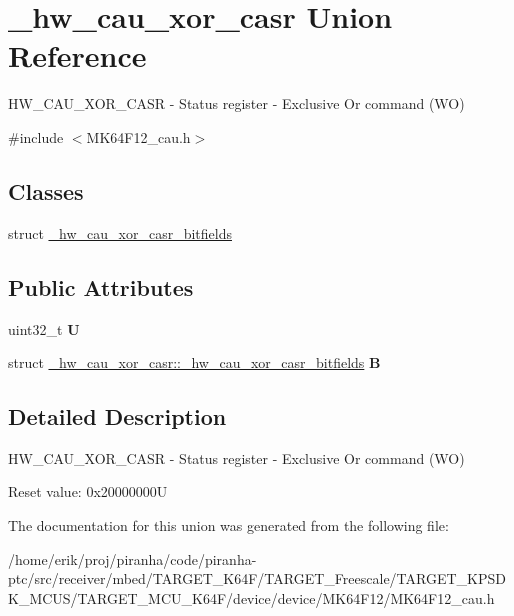 \hypertarget{union__hw__cau__xor__casr}{}\section{\+\_\+hw\+\_\+cau\+\_\+xor\+\_\+casr Union Reference}
\label{union__hw__cau__xor__casr}


H\+W\+\_\+\+C\+A\+U\+\_\+\+X\+O\+R\+\_\+\+C\+A\+SR -\/ Status register -\/ Exclusive Or command (WO)  




{\ttfamily \#include $<$M\+K64\+F12\+\_\+cau.\+h$>$}

\subsection*{Classes}
\begin{DoxyCompactItemize}
\item 
struct \hyperlink{struct__hw__cau__xor__casr_1_1__hw__cau__xor__casr__bitfields}{\+\_\+hw\+\_\+cau\+\_\+xor\+\_\+casr\+\_\+bitfields}
\end{DoxyCompactItemize}
\subsection*{Public Attributes}
\begin{DoxyCompactItemize}
\item 
uint32\+\_\+t {\bfseries U}\hypertarget{union__hw__cau__xor__casr_ad98a04c8fafab687ca281b31787331c5}{}\label{union__hw__cau__xor__casr_ad98a04c8fafab687ca281b31787331c5}

\item 
struct \hyperlink{struct__hw__cau__xor__casr_1_1__hw__cau__xor__casr__bitfields}{\+\_\+hw\+\_\+cau\+\_\+xor\+\_\+casr\+::\+\_\+hw\+\_\+cau\+\_\+xor\+\_\+casr\+\_\+bitfields} {\bfseries B}\hypertarget{union__hw__cau__xor__casr_a28b63d091a007578dd13db550fda5536}{}\label{union__hw__cau__xor__casr_a28b63d091a007578dd13db550fda5536}

\end{DoxyCompactItemize}


\subsection{Detailed Description}
H\+W\+\_\+\+C\+A\+U\+\_\+\+X\+O\+R\+\_\+\+C\+A\+SR -\/ Status register -\/ Exclusive Or command (WO) 

Reset value\+: 0x20000000U 

The documentation for this union was generated from the following file\+:\begin{DoxyCompactItemize}
\item 
/home/erik/proj/piranha/code/piranha-\/ptc/src/receiver/mbed/\+T\+A\+R\+G\+E\+T\+\_\+\+K64\+F/\+T\+A\+R\+G\+E\+T\+\_\+\+Freescale/\+T\+A\+R\+G\+E\+T\+\_\+\+K\+P\+S\+D\+K\+\_\+\+M\+C\+U\+S/\+T\+A\+R\+G\+E\+T\+\_\+\+M\+C\+U\+\_\+\+K64\+F/device/device/\+M\+K64\+F12/M\+K64\+F12\+\_\+cau.\+h\end{DoxyCompactItemize}
